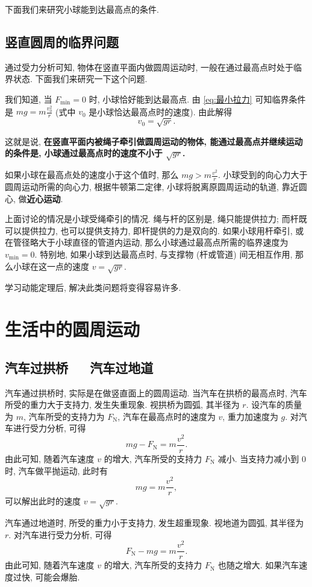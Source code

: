 \documentclass[UTF8,openany,fontset=fandol]{ctexbook}
\theoremstyle{chinesetextbook}
\newcommand{\bre}{\ \ \ }
\begin{document}
下面我们来研究小球能到达最高点的条件.
\subsection{竖直圆周的临界问题}
通过受力分析可知, 物体在竖直平面内做圆周运动时, 一般在通过最高点时处于临界状态. 下面我们来研究一下这个问题.

我们知道, 当 $F_\text{min}=0$ 时, 小球恰好能到达最高点. 由 \eqref{eq:最小拉力} 可知临界条件是 $\displaystyle mg=m\frac{v_0^2}{r}$ (式中 $v_0$ 是小球恰达最高点时的速度). 由此解得
\begin{equation}\label{eq:临界速度}
v_0=\sqrt{gr}.
\end{equation}

这就是说, \textbf{在竖直平面内被绳子牵引做圆周运动的物体, 能通过最高点并继续运动的条件是, 小球通过最高点时的速度不小于 $\sqrt{gr}$.}

如果小球在最高点处的速度小于这个值时, 那么 $\displaystyle mg>m\frac{v^2}{r}$. 小球受到的向心力大于圆周运动所需的向心力, 根据牛顿第二定律, 小球将脱离原圆周运动的轨道, 靠近圆心, 做\textbf{近心运动}.

上面讨论的情况是小球受绳牵引的情况. 绳与杆的区别是, 绳只能提供拉力; 而杆既可以提供拉力, 也可以提供支持力, 即杆提供的力是双向的. 如果小球用杆牵引, 或在管径略大于小球直径的管道内运动, 那么小球通过最高点所需的临界速度为 $v_\text{min}=0$. 特别地, 如果小球到达最高点时, 与支撑物 (杆或管道) 间无相互作用, 那么小球在这一点的速度 $v=\sqrt{gr}$.

学习动能定理后, 解决此类问题将变得容易许多.
\section{生活中的圆周运动}
\subsection*{汽车过拱桥\bre 汽车过地道}
汽车通过拱桥时, 实际是在做竖直面上的圆周运动. 当汽车在拱桥的最高点时, 汽车所受的重力大于支持力, 发生失重现象. 视拱桥为圆弧, 其半径为 $r$. 设汽车的质量为 $m$, 汽车所受的支持力为 $F_\mathrm{N}$, 汽车在最高点时的速度为 $v$, 重力加速度为 $g$. 对汽车进行受力分析, 可得
\[
mg-F_\mathrm{N}=m\frac{v^2}{r}.
\]
由此可知, 随着汽车速度 $v$ 的增大, 汽车所受的支持力 $F_\mathrm{N}$ 减小. 当支持力减小到 0 时, 汽车做平抛运动, 此时有
\[
mg=m\frac{v^2}{r},
\]
可以解出此时的速度 $v=\sqrt{gr}.$

汽车通过地道时, 所受的重力小于支持力, 发生超重现象. 视地道为圆弧, 其半径为 $r$. 对汽车进行受力分析, 可得
\[
F_\mathrm{N}-mg=m\frac{v^2}{r}.
\]
由此可知, 随着汽车速度 $v$ 的增大, 汽车所受的支持力 $F_\mathrm{N}$ 也随之增大. 如果汽车速度过快, 可能会爆胎.
\end{document}
